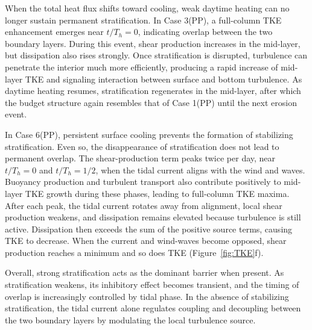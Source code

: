 \documentclass[draft]{agujournal2019}
\begin{document}
When the total heat flux shifts toward cooling, weak daytime heating can no longer sustain permanent stratification. In Case 3(PP), a full-column TKE enhancement emerges near $t/T_h=0$, indicating overlap between the two boundary layers. During this event, shear production increases in the mid-layer, but dissipation also rises strongly.  Once stratification is disrupted, turbulence can penetrate the interior much more efficiently, producing a rapid increase of mid-layer TKE and signaling interaction between surface and bottom turbulence. As daytime heating resumes, stratification regenerates in the mid-layer, after which the budget structure again resembles that of Case 1(PP) until the next erosion event.

In Case 6(PP), persistent surface cooling prevents the formation of stabilizing stratification. Even so, the disappearance of stratification does not lead to permanent overlap. The shear-production term peaks twice per day, near $t/T_h=0$ and $t/T_h=1/2$, when the tidal current aligns with the wind and waves. Buoyancy production and turbulent transport also contribute positively to mid-layer TKE growth during these phases, leading to full-column TKE maxima. After each peak, the tidal current rotates away from alignment, local shear production weakens, and dissipation remains elevated because turbulence is still active. Dissipation then exceeds the sum of the positive source terms, causing TKE to decrease. When the current and wind-waves become opposed, shear production reaches a minimum and so does TKE (Figure~\ref{fig:TKE}f).

Overall, strong stratification acts as the dominant barrier when present. As stratification weakens, its inhibitory effect becomes transient, and the timing of overlap is increasingly controlled by tidal phase. In the absence of stabilizing stratification, the tidal current alone regulates coupling and decoupling between the two boundary layers by modulating the local turbulence source.
\end{document}
